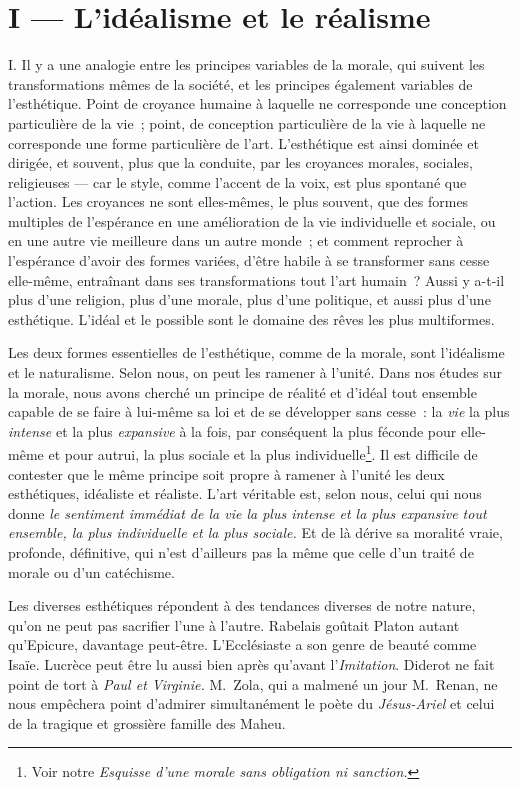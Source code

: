 \documentclass[french,twoside]{book} %
\begin{document}
\section[{I — L’idéalisme et le réalisme}]{I — L’idéalisme et le réalisme}
\noindent I. Il y a une analogie entre les principes variables de la morale, qui suivent les transformations mêmes de la société, et les principes également variables de l’esthétique. Point de croyance humaine à laquelle ne corresponde une conception particulière de la vie ; point, de conception particulière de la vie à laquelle ne corresponde une forme particulière de l’art. L’esthétique est ainsi dominée et dirigée, et souvent, plus que la conduite, par les croyances morales, sociales, religieuses — car le style, comme l’accent de la voix, est plus spontané que l’action. Les croyances ne sont elles-mêmes, le plus souvent, que des formes multiples de l’espérance en une amélioration de la vie individuelle et sociale, ou en une autre vie meilleure dans un autre monde ; et comment reprocher à l’espérance d’avoir des formes variées, d’être habile à se transformer sans cesse elle-même, entraînant dans ses transformations tout l’art humain ? Aussi y a-t-il plus d’une religion, plus d’une morale, plus d’une politique, et aussi plus d’une esthétique. L’idéal et le possible sont le domaine des rêves les plus multiformes.\par
Les deux formes essentielles de l’esthétique, comme de la morale, sont l’idéalisme et le naturalisme. Selon nous, on peut les ramener à l’unité. Dans nos études sur la morale, nous avons cherché un principe de réalité et d’idéal tout ensemble capable de se faire à lui-même sa loi et de se développer sans cesse : la \emph{vie} la plus \emph{intense} et la plus \emph{expansive} à la fois, par conséquent la plus féconde pour elle-même et pour autrui, la plus sociale et la plus individuelle\footnote{ Voir notre \emph{Esquisse d’une morale sans obligation ni sanction.}}. Il est difficile de contester que le même principe soit propre à ramener à l’unité les deux esthétiques, idéaliste et réaliste. L’art véritable est, selon nous, celui qui nous donne \emph{le sentiment immédiat de la vie la plus intense et la plus expansive tout ensemble, la plus individuelle et la plus sociale.} Et de là dérive sa moralité vraie, profonde, définitive, qui n’est d’ailleurs pas la même que celle d’un traité de morale ou d’un catéchisme.\par
Les diverses esthétiques répondent à des tendances diverses de notre nature, qu’on ne peut pas sacrifier l’une à l’autre. Rabelais goûtait Platon autant qu’Epicure, davantage peut-être. L’Ecclésiaste a son genre de beauté comme Isaïe. Lucrèce peut être lu aussi bien après qu’avant l’\emph{Imitation}. Diderot ne fait point de tort à \emph{Paul et Virginie.} M. Zola, qui a malmené un jour M. Renan, ne nous empêchera point d’admirer simultanément le poète du \emph{Jésus-Ariel} et celui de la tragique et grossière famille des Maheu.\par
\end{document}
